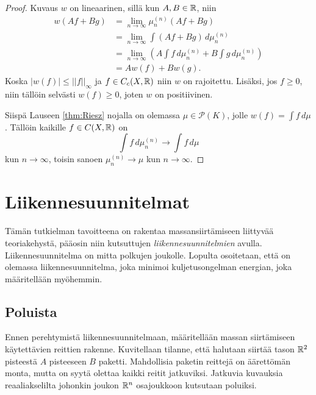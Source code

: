 \documentclass[12pt,oneside,a4paper]{amsbook} %
\begin{document}
\begin{proof}
    Kuvaus $w$ on lineaarinen, sillä kun $A, B \in \mathbb{R}$, niin
    \begin{align*}
        w(A f + B g) &= \lim_{n \to \infty} \mu_n^{(n)}(A f + B g) \\
        &=\lim_{n \to \infty} \int (A f + B g) \, d\mu_n^{(n)} \\
        &=\lim_{n \to \infty}  \left(A \int f \, d\mu_n^{(n)} + B \int g \, d\mu_n^{(n)}\right)  \\
        &= A w(f) + B w(g).
    \end{align*}
    Koska $|w(f)| \le ||f||_\infty$ ja $f \in C_c(X, \mathbb{R})$ niin $w$ on rajoitettu. Lisäksi, jos $f \ge 0$, niin tällöin selvästi $w(f) \ge 0$, joten $w$ on positiivinen.


    Siispä Lauseen \ref{thm:Riesz} nojalla on olemassa $\mu \in \mathcal P(K)$, jolle $w(f) = \int f \, d\mu$. Tällöin kaikille $f \in C(X, \mathbb{R})$ on
    \begin{equation*}
        \int f \, d\mu_n^{(n)} \to \int f \, d\mu
    \end{equation*}
    kun $n \to \infty$, toisin sanoen $\mu_n^{(n)} \to \mu$ kun $n \to \infty$.
\end{proof}

\chapter{Liikennesuunnitelmat}

Tämän tutkielman tavoitteena on rakentaa massansiirtämiseen liittyvää teoriakehystä, pääosin niin kutsuttujen \textit{liikennesuunnitelmien} avulla. Liikennesuunnitelma on mitta polkujen joukolle. Lopulta osoitetaan, että on olemassa liikennesuunnitelma, joka minimoi kuljetusongelman energian, joka määritellään myöhemmin. 

\section{Poluista}
Ennen perehtymistä liikennesuunnitelmaan, määritellään massan siirtämiseen käytettävien reittien rakenne. Kuvitellaan tilanne, että halutaan siirtää tason $\mathbb{R}^2$ pisteestä $A$ pisteeseen $B$ paketti. Mahdollisia paketin reittejä on äärettömän monta, mutta on syytä olettaa kaikki reitit jatkuviksi. Jatkuvia kuvauksia reaaliakselilta johonkin joukon $\mathbb{R}^n$ osajoukkoon kutsutaan poluiksi. 
\end{document}
